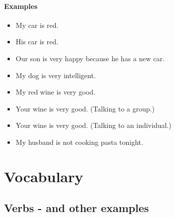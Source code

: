 \paragraph{Examples}
\begin{itemize}
    \item My car is red. \\
    \item His car is red. \\
    \item Our son is very happy because he has a new car. \\
    \item My dog is very intelligent. \\
    \item My red wine is very good. \\
    \item Your wine is very good. (Talking to a group.)\\
    \item Your wine is very good. (Talking to an individual.) \\
    \item My husband is not cooking pasta tonight. \\
\end{itemize}

\section{Vocabulary} \label{0207-Vocabulary}
\subsection{Verbs -  and other  examples}


